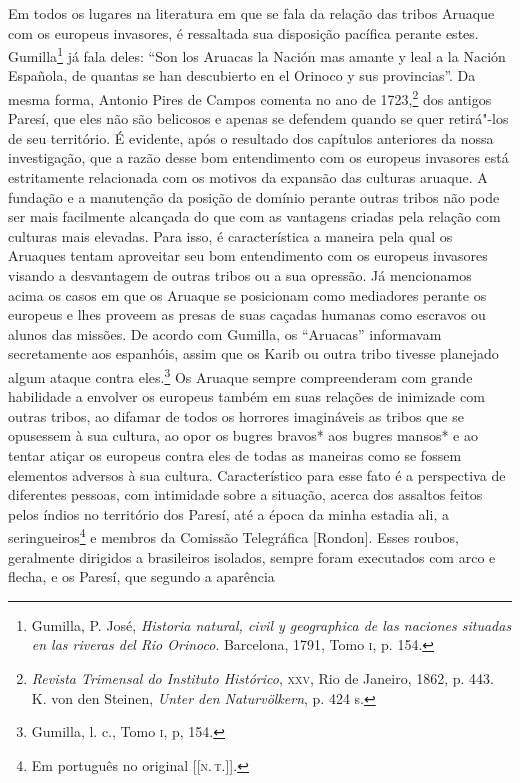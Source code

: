 Em todos os lugares na literatura em que se fala da relação das tribos
Aruaque com os europeus invasores, é ressaltada sua disposição pacífica
perante estes. Gumilla\footnote{Gumilla, P. José, \emph{Historia
  natural, civil y geographica de las naciones situadas en las riveras
  del Rio Orinoco}. Barcelona, 1791, Tomo \textsc{i}, p. 154.} já fala deles:
``Son los Aruacas la Nación mas amante y leal a la Nación Española, de
quantas se han descubierto en el Orinoco y sus provincias''. Da mesma
forma, Antonio Pires de Campos comenta no ano de 1723,\footnote{\emph{Revista
  Trimensal do Instituto Histórico}, \textsc{xxv}, Rio de Janeiro, 1862, p. 443.
  K. von den Steinen, \emph{Unter den Naturvölkern}, p. 424 s.} dos
antigos Paresí, que eles não são belicosos e apenas se defendem quando
se quer retirá"-los de seu território. É evidente, após o resultado dos
capítulos anteriores da nossa investigação, que a razão desse bom
entendimento com os europeus invasores está estritamente relacionada
com os motivos da expansão das culturas aruaque. A fundação e a
manutenção da posição de domínio perante outras tribos não pode ser mais
facilmente alcançada do que com as vantagens criadas pela relação com
culturas mais elevadas. Para isso, é característica a maneira pela qual
os Aruaques tentam aproveitar seu bom entendimento com os europeus
invasores visando a desvantagem de outras tribos ou a sua opressão. Já
mencionamos acima os casos em que os Aruaque se posicionam como
mediadores perante os europeus e lhes proveem as presas de suas caçadas
humanas como escravos ou alunos das missões. De acordo com Gumilla, os
``Aruacas'' informavam secretamente aos espanhóis, assim que os Karib
ou outra tribo tivesse planejado algum ataque contra eles.\footnote{Gumilla,
  l. c., Tomo \textsc{i}, p, 154.} Os Aruaque sempre
compreenderam com grande habilidade a envolver os europeus também em
suas relações de inimizade com outras tribos, ao difamar de todos os
horrores imagináveis as tribos que se opusessem à sua cultura, ao opor
os bugres bravos* aos bugres mansos* e ao tentar atiçar os europeus
contra eles de todas as maneiras como se fossem elementos adversos à sua
cultura. Característico para esse fato é a perspectiva de diferentes
pessoas, com intimidade sobre a situação, acerca dos assaltos feitos
pelos índios no território dos Paresí, até a época da minha estadia
ali, a seringueiros\footnote{Em português no original {[}{[}\textsc{n.\,t.}{]}{]}.} e membros da Comissão Telegráfica {[}Rondon{]}.
Esses roubos, geralmente dirigidos a brasileiros isolados, sempre foram
executados com arco e flecha, e os Paresí, que segundo a aparência
